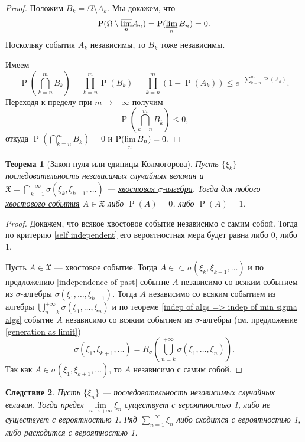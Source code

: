 \documentclass[12pt]{article}
\newtheorem{theorem}{Теорема}
\newtheorem{corollary}[theorem]{Следствие}
\numberwithin{theorem}{section}
\theoremstyle{definition}
\newcommand{\prob}{\operatorname{P}}
\begin{document}
	\begin{proof}
		Положим $ B_k = \Omega \setminus A_k $.
		Мы докажем, что $$ \prob(\Omega \setminus \overline{\lim\limits_{n}} A_n)
		= \prob(\varliminf\limits_{n} B_n) = 0. $$
		Поскольку события $ A_k $ независимы, то $ B_k $ тоже независимы.
		
		Имеем $$ \prob(\bigcap\limits_{k = n}^{m} B_k) = \prod\limits_{k = n}^{m} \prob(B_k) 
		= \prod\limits_{k = n}^{m} (1 - \prob(A_k)) \leqslant e^{-\sum\limits_{k = n}^{m} \prob(A_k)}. $$
		Переходя к пределу при $ m \to +\infty $
		получим 
		$$ \prob(\bigcap\limits_{k = n}^{m} B_k) \leqslant 0, $$
		откуда $ \prob(\bigcap\limits_{k = n}^{m} B_k) = 0 $ и $ \prob(\varliminf\limits_{n} B_n) = 0 $.
	\end{proof}
	
	\begin{theorem}[Закон нуля или единицы Колмогорова] \label{zero one law}
		Пусть $ \{\xi_k\} $ --- последовательность независимых случайных величин
		и $ \mathfrak{X} = \bigcap\limits_{k = 1}^{+\infty} \sigma(\xi_k, \xi_{k + 1}, \ldots) $
		--- \hyperlink{tail-sigma-algebra}{хвостовая $ \sigma $-алгебра}.
		Тогда для любого \hyperlink{tail-event}{хвостового события} $ A \in \mathfrak{X} $ либо $ \prob(A) = 0 $, либо $ \prob(A) = 1 $.
	\end{theorem}
	
	\begin{proof}
		Докажем, что всякое хвостовое событие независимо с самим собой.
		Тогда по критерию \ref{self independent} его вероятностная мера будет равна либо 0, либо 1.
		
		Пусть $ A \in \mathfrak{X} $ --- хвостовое событие.
		Тогда $ A \in \subset \sigma(\xi_k, \xi_{k + 1}, \ldots) $
		и по предложению \ref{independence of past} событие $ A $ независимо
		со всяким событием из $ \sigma $-алгебры $ \sigma(\xi_1, \ldots, \xi_{k - 1}) $.
		Тогда $ A $ независимо со всяким событием из алгебры
		$ \bigcup\limits_{n = k}^{+\infty} \sigma(\xi_1, \ldots, \xi_n) $
		и по теореме \ref{indep of algs => indep of min sigma algs}
		событие $ A $ независимо со всяким событием
		из $ \sigma $-алгебры (см. предложение \ref{generation as limit})
		$$ \sigma(\xi_1, \xi_{k + 1}, \ldots) = R_{\sigma}(\bigcup\limits_{n = k}^{+\infty} \sigma(\xi_1, \ldots, \xi_n)). $$
		Так как $ A \in \sigma(\xi_1, \xi_{k + 1}, \ldots) $, то $ A $ независимо с самим собой.
	\end{proof}

	\begin{corollary}
		Пусть $ \{\xi_n\} $ --- последовательность независимых случайных величин.
		Тогда предел $ \lim\limits_{n \to +\infty} \xi_n $ существует с вероятностью 1,
		либо не существует с вероятностью 1.
		Ряд $ \sum\limits_{n = 1}^{+\infty} \xi_n $ либо сходится с вероятностью 1,
		либо расходится с вероятностью 1.
	\end{corollary}
	
\end{document}
